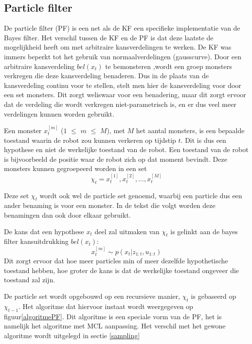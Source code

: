 \documentclass{book}
\begin{document}
\subsection{Particle filter}

De particle filter (PF) is een net als de KF een specifieke implementatie van de Bayes filter.
Het verschil tussen de KF en de PF is dat deze laatste de mogelijkheid heeft om met arbitraire kansverdelingen te werken. De KF was immers beperkt tot het gebruik van normaalverdelingen (gausscurve). Door een arbitraire kansverdeling $bel(x_{t})$ te bemonsteren ,wordt een groep monsters verkregen die deze kansverdeling benaderen. Dus in de plaats van de kansverdeling continu voor te stellen, stelt men hier de kansverdeling voor door een set monsters. Dit zorgt weliswaar voor een benadering, maar dit zorgt ervoor dat de verdeling die wordt verkregen niet-parametrisch is, en er dus veel meer verdelingen kunnen worden gebruikt.

Een monster $x_{t}^{[m]}$ ($1$ $\leqslant$ $m$ $\leqslant$ $M$), met $M$ het aantal monsters, is een bepaalde toestand waarin de robot zou kunnen verkeren op tijdstip $t$. Dit is dus een hypothese en niet de werkelijke toestand van de robot. Een toestand van de robot is bijvoorbeeld de positie waar de robot zich op dat moment bevindt.
Deze monsters kunnen gegroepeerd worden in een set 
\begin{equation}
\chi_{t} =x_{t}^{[1]}, x_{t}^{[2]},...,x_{t}^{[M]}
\end{equation}

Deze set $\chi_{t}$ wordt ook wel de particle set genoemd, waarbij een particle dus een ander benaming is voor een monster. In de tekst die volgt worden deze benamingen dan ook door elkaar gebruikt.

De kans dat een hypothese $x_{t}$ deel zal uitmaken van $\chi_{t}$ is gelinkt aan de bayes filter kansuitdrukking $bel(x_{t})$:
\begin{equation}
x_{t}^{[m]}  \sim p( x_{t} | z_{1:t}  ,  u_{1:t}) 
\end{equation}
Dit zorgt ervoor dat hoe meer particles min of meer dezelfde hypothetische toestand hebben, hoe groter de kans is dat de werkelijke toestand ongeveer die toestand zal zijn.

De particle set wordt opgebouwd op een recursieve manier, $\chi_{t}$ is gebaseerd op $\chi_{t-1}$. Het algoritme dat hiervoor instaat wordt weergegeven op figuur\ref{algoritmePF}. Dit algoritme is een speciale vorm van de PF, het is namelijk het algoritme met MCL aanpassing. Het verschil met het gewone algoritme wordt uitgelegd in sectie \ref{sampling}
\end{document}
